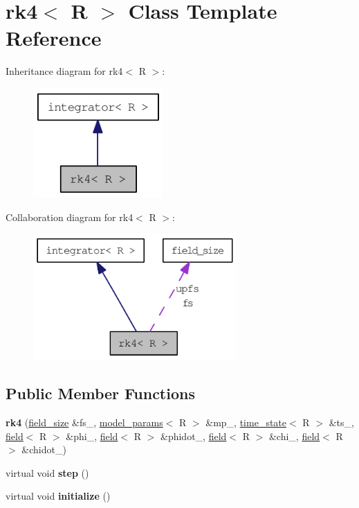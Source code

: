 \hypertarget{classrk4}{
\section{rk4$<$ R $>$ Class Template Reference}
\label{classrk4}
}
Inheritance diagram for rk4$<$ R $>$:\nopagebreak
\begin{figure}[H]
\begin{center}
\leavevmode
\includegraphics[width=140pt]{classrk4__inherit__graph}
\end{center}
\end{figure}
Collaboration diagram for rk4$<$ R $>$:\nopagebreak
\begin{figure}[H]
\begin{center}
\leavevmode
\includegraphics[width=220pt]{classrk4__coll__graph}
\end{center}
\end{figure}
\subsection*{Public Member Functions}
\begin{DoxyCompactItemize}
\item 
\hypertarget{classrk4_a6b6538e79bab2ccb9b65b953f8871073}{
{\bfseries rk4} (\hyperlink{structfield__size}{field\_\-size} \&fs\_\-, \hyperlink{structmodel__params}{model\_\-params}$<$ R $>$ \&mp\_\-, \hyperlink{structtime__state}{time\_\-state}$<$ R $>$ \&ts\_\-, \hyperlink{classfield}{field}$<$ R $>$ \&phi\_\-, \hyperlink{classfield}{field}$<$ R $>$ \&phidot\_\-, \hyperlink{classfield}{field}$<$ R $>$ \&chi\_\-, \hyperlink{classfield}{field}$<$ R $>$ \&chidot\_\-)}
\label{classrk4_a6b6538e79bab2ccb9b65b953f8871073}

\item 
\hypertarget{classrk4_a10c9b1ff5a625427a90f5d235c0d4aec}{
virtual void {\bfseries step} ()}
\label{classrk4_a10c9b1ff5a625427a90f5d235c0d4aec}

\item 
\hypertarget{classrk4_a1925c4efac74de9bec188b4c6c5a3b1c}{
virtual void {\bfseries initialize} ()}
\label{classrk4_a1925c4efac74de9bec188b4c6c5a3b1c}

\end{DoxyCompactItemize}
